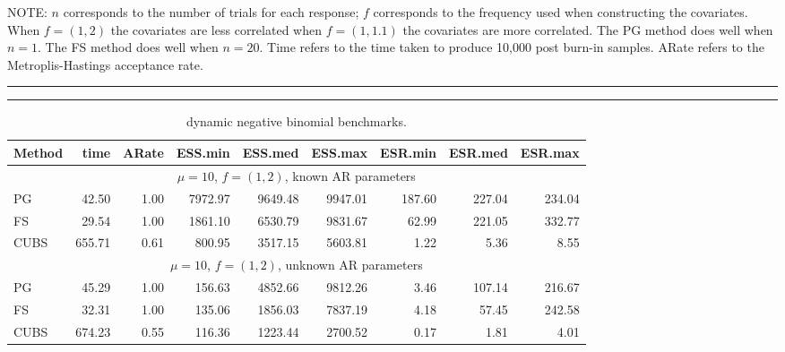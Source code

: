 \documentclass[12pt]{article}
\begin{document}
\begin{table}
NOTE: $n$ corresponds to the number of trials for each response; $f$ corresponds
to the frequency used when constructing the covariates.  When $f = (1,2)$ the
covariates are less correlated when $f=(1,1.1)$ the covariates are more
correlated.  The PG method does well when $n=1$.  The FS method does well when
$n=20$.  Time refers to the time taken to produce 10,000 post burn-in samples.
ARate refers to the Metroplis-Hastings acceptance rate.
\end{table}


\begin{table}

\begin{center}
\caption{\label{tab:dynnb-detail} dynamic negative binomial benchmarks.}
\hrule
\vspace{2pt}
\hrule
\end{center}

\begin{center}
\small
\begin{tabular}{l r r r r r r r r } 
Method  &    time  &   ARate  &  ESS.min  &  ESS.med  &  ESS.max  &  ESR.min  & ESR.med  &  ESR.max \\
\hline

 \multicolumn{9}{c}{$\mu=10$, $f = (1,2)$, known AR parameters} \\
             PG   &    42.50 &     1.00 &   7972.97 &   9649.48 &   9947.01 &    187.60 &    227.04 &    234.04 \\ 
             FS   &    29.54 &     1.00 &   1861.10 &   6530.79 &   9831.67 &     62.99 &    221.05 &    332.77 \\ 
           CUBS   &   655.71 &     0.61 &    800.95 &   3517.15 &   5603.81 &      1.22 &      5.36 &      8.55
 \\ %

 \multicolumn{9}{c}{$\mu=10$, $f = (1,2)$, unknown AR parameters} \\
             PG   &    45.29 &     1.00 &    156.63 &   4852.66 &   9812.26 &      3.46 &    107.14 &    216.67 \\ 
             FS   &    32.31 &     1.00 &    135.06 &   1856.03 &   7837.19 &      4.18 &     57.45 &    242.58 \\ 
           CUBS   &   674.23 &     0.55 &    116.36 &   1223.44 &   2700.52 &      0.17 &      1.81 &      4.01
 \\ %


\end{tabular}
\end{center}
\end{table}
\end{document}
